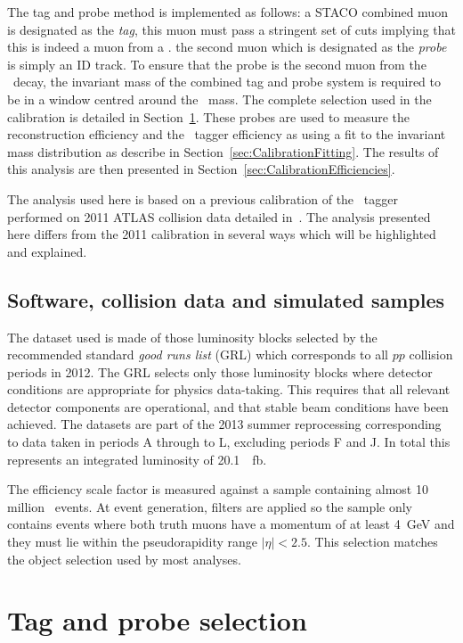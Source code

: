 The tag and probe method is implemented as follows: a STACO combined muon is designated as the \emph{tag}, this muon must pass a stringent set of cuts implying that this is indeed a muon from a \jpsi. the second muon which is designated as the \emph{probe} is simply an ID track. To ensure that the probe is the second muon from the \jpsi\ decay, the invariant mass of the combined tag and probe system is required to be in a window centred around the \jpsi\ mass. The complete selection used in the calibration is detailed in Section~\ref{sec:CalibrationSelection}. These probes are used to measure the reconstruction efficiency and the \xsm\ tagger efficiency as using a fit to the invariant mass distribution as describe in Section~\ref{sec:CalibrationFitting}. The results of this analysis are then presented in Section~\ref{sec:CalibrationEfficiencies}.

The analysis used here is based on a previous calibration of the \xsm\ tagger performed on 2011 ATLAS collision data detailed in~\cite{Calibration:MattThesis}. The analysis presented here differs from the 2011 calibration in several ways which will be highlighted and explained.

\subsection*{Software, collision data and simulated samples}

The dataset used is made of those luminosity blocks selected by the recommended standard \emph{good runs list} (GRL) which corresponds to all $pp$ collision periods in 2012. The GRL selects only those luminosity blocks where detector conditions are appropriate for physics data-taking. This requires that all relevant detector components are operational, and that stable beam conditions have been achieved. The datasets are part of the 2013 summer reprocessing corresponding to data taken in periods A through to L, excluding periods F and J. In total this represents an integrated luminosity of \SI{20.1}{\per\femto\barn}. 

The efficiency scale factor is measured against a sample containing almost 10 million \JMu\ events. At event generation, filters are applied so the sample only contains events where both truth muons have a momentum of at least \SI{4}{\GeV} and they must lie within the pseudorapidity range $|\eta|<2.5$. This selection matches the object selection used by most analyses. 

\section{Tag and probe selection} \label{sec:CalibrationSelection}

